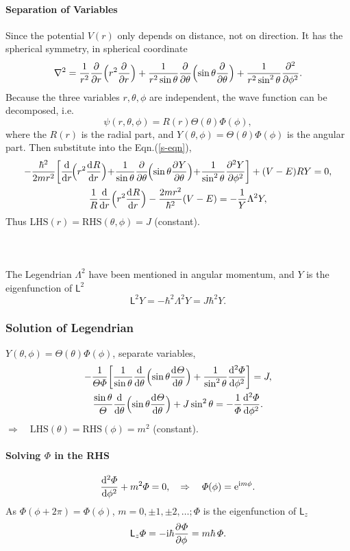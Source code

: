 \documentclass{article}
\newcommand*{\op}[1]{\mathsf{#1}}
\newcommand{\ko}[1]{\hspace{-#1 pt}}
\begin{document}
\paragraph{Separation of Variables}
Since the potential $V(r)$ only depends on distance, not on direction. It has the spherical symmetry, %
in spherical coordinate
$$\laplacian=\frac1{r^2}\pp r\Bigp{r^2\pp r}+\frac1{r^2\sin\theta}\pp \theta\Bigp{\sin\theta\pp \theta}+\frac1{r^2\sin^2\theta}\pp[2]\phi.$$
Because the three variables $r,\theta,\phi$ are independent, the wave function can be decomposed, i.e.%
$$\psi(r,\theta,\phi)=R(r)\varTheta(\theta)\varPhi(\phi),$$
where the $R(r)$ is the radial part, and $Y(\theta,\phi)=\varTheta(\theta)\varPhi(\phi)$ is the angular part.
Then substitute into the Eqn.(\ref{s-eqn}),
\begin{gather*}
	-\frac{\hbar^2}{2mr^2}\biggl[\dd r\ko2\Bigl(r^2\dv Rr\Bigr)\ko2+\ko2\frac1{\sin\theta}\pp \theta\ko1\Bigl(\sin\theta\pv Y\theta\Bigr)\ko2+\ko2\frac1{\sin^2\theta}\pv[2] Y\phi\biggr]+(V-E)RY=0,\\
	\frac1R\dd r\Bigl(r^2\dv Rr\Bigr)-\frac{2mr^2}{\hbar^2}(V-E)=-\frac1Y\Lambda^2Y,
\end{gather*}
Thus $\mathrm{LHS}(r)=\mathrm{RHS}(\theta,\phi)=J$ (constant).
\paragraph{~}The Legendrian $\Lambda^2$ have been mentioned in angular momentum, and $Y$ is the eigenfunction of $\op{L}^2$
$$\op{L}^2Y=-\hbar^2\Lambda^2Y=J\hbar^2Y.$$
\subsubsection{Solution of Legendrian}
$Y(\theta,\phi)=\varTheta(\theta)\varPhi(\phi)$, separate variables,
\begin{gather*}
	-\frac1{\varTheta\varPhi}\biggl[\frac1{\sin\theta}\dd \theta\Bigl(\sin\theta\dv\varTheta\theta\Bigr)+\frac1{\sin^2\theta}\dv[2]\varPhi\phi\biggr]=J,\\
	\frac{\sin\theta}\varTheta\dd \theta\Bigl(\sin\theta\dv\varTheta\theta\Bigr)+J\sin^2\theta=-\frac1\varPhi\dv[2]\varPhi\phi.
\end{gather*}
$\Rightarrow\quad \mathrm{LHS}(\theta)=\mathrm{RHS}(\phi)=m^2$ (constant).
\paragraph{Solving $\varPhi$ in the RHS}
$$\dv[2]\varPhi\phi+m^2\varPhi=0,\quad\Rightarrow\quad\varPhi(\phi)=\e^{\i m\phi}.$$
As $\varPhi(\phi+2\pi)=\varPhi(\phi)$, $m=0,\pm1,\pm2,\ldots;\varPhi$ is the eigenfunction of $\op{L}_z$
$$\op{L}_z\varPhi=-\i\hbar\pv\varPhi\phi=m\hbar\,\varPhi.$$
\end{document}

